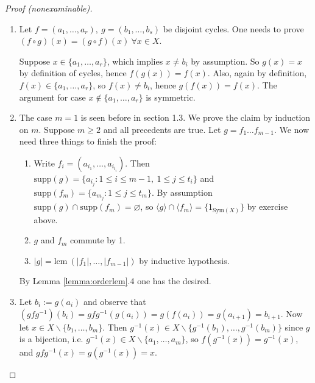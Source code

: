 \documentclass[a4paper]{article}
\newcommand{\Sym}{\text{Sym}}
\newcommand{\supp}{\text{supp}}
\newcommand{\lcm}{\text{lcm}\ }
\theoremstyle{definition}
\begin{document}
\begin{proof}[Proof (nonexaminable)]
\begin{enumerate}
\item Let $f=(a_1,\ldots,a_r),\ g=(b_1,\ldots,b_s)$ be disjoint cycles. One needs to prove $(f\circ g)(x)=(g\circ f)(x) \ \forall x\in X$.

Suppose $x\in\{a_1,\ldots,a_r\}$, which implies $x\neq b_i$ by assumption. So $g(x)=x$ by definition of cycles, hence $f(g(x))=f(x)$. Also, again by definition, $f(x)\in\{a_1,\ldots,a_r\}$, so $f(x)\neq b_i$, hence $g(f(x))=f(x)$. The argument for case $x\notin \{a_1,\ldots,a_r\}$ is symmetric.
\item The case $m=1$ is seen before in section 1.3. We prove the claim by induction on $m$. Suppose $m\geq 2$ and all precedents are true. Let $g=f_1\ldots f_{m-1}$. We now need three things to finish the proof:
\begin{enumerate}
\item Write $f_i=(a_{i_1},\ldots,a_{i_{t_i}})$. Then $\supp(g)=\{a_{i_j}:1\leq i\leq m-1,\ 1\leq j\leq t_i\}$ and $\supp(f_m)=\{a_{m_j}:1\leq j\leq t_m\}$. By assumption $\supp(g)\cap\supp(f_m)=\varnothing$, so $\langle g\rangle \cap \langle f_m\rangle=\{1_{\Sym(X)}\}$ by exercise above.
\item $g$ and $f_m$ commute by 1.
\item $|g|=\lcm(|f_1|,\ldots,|f_{m-1}|)$ by inductive hypothesis.
\end{enumerate}
By Lemma \ref{lemma:orderlem}.4 one has the desired.
\item Let $b_i:=g(a_i)$ and observe that $(gfg^{-1})(b_i)=gfg^{-1}(g(a_i))=g(f(a_i))=g(a_{i+1})=b_{i+1}$. Now let $x\in X\backslash\{b_1,\ldots,b_m\}$. Then $g^{-1}(x)\in X\backslash\{g^{-1}(b_1),\ldots,g^{-1}(b_m)\}$ since $g$ is a bijection, i.e. $g^{-1}(x)\in X\backslash\{a_1,\ldots,a_m\}$, so $f(g^{-1}(x))=g^{-1}(x)$, and $gfg^{-1}(x)=g(g^{-1}(x))=x$.
\end{enumerate}
\end{proof}
\end{document}

